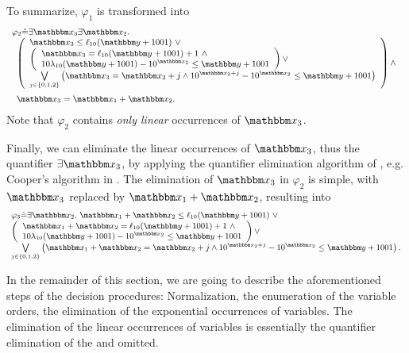 To summarize, $\varphi_1$ is transformed into 
\[
\small
\begin{array}{l}
\varphi_2 \Def \exists \ivarx_3 \exists \ivarx_2. \\
\begin{array}{l}
\vspace{2mm}
\left(
\begin{array}{l}
\ivarx_3 \le \ell_{10}(\ivary+1001)\ \vee \\
\left(
\begin{array}{l}
\ivarx_3 = \ell_{10}(\ivary+1001)+1\ \wedge \\
10 \lambda_{10}(\ivary+1001) - 10^{\ivarx_2} \le \ivary + 1001 
\end{array}
\right) \vee \\
%
 \bigvee \limits_{j \in \{0,1,2\}}  \left(\ivarx_3 = \ivarx_2 +j \wedge 10^{\ivarx_2 + j} - 10^{\ivarx_2} \le \ivary + 1001\right)
\end{array}
\right) 
\wedge \\
 \ivarx_3 = \ivarx_1 + \ivarx_2.
 \end{array}
\end{array}
\]
Note that $\varphi_2$ contains \emph{only linear} occurrences of $\ivarx_3$.

Finally, we can eliminate the linear occurrences of $\ivarx_3$, thus the quantifier $\exists \ivarx_3$, by applying the quantifier elimination algorithm of {\pa}, e.g. Cooper's algorithm in \cite{Cooper72}. The elimination of $\ivarx_3$ in $\varphi_2$ is simple, with $\ivarx_3$ replaced by $\ivarx_1 + \ivarx_2$, resulting into  
\[
\small
\begin{array}{l}
\varphi_3 \Def \exists \ivarx_2.\ 
\ivarx_1 + \ivarx_2 \le \ell_{10}(\ivary+1001)\ \vee \\
\left(
\begin{array}{l}
\ivarx_1 + \ivarx_2 = \ell_{10}(\ivary+1001)+1\ \wedge \\
10 \lambda_{10}(\ivary+1001) - 10^{\ivarx_2} \le \ivary + 1001 
\end{array}
\right) \vee \\
%
 \bigvee \limits_{j \in \{0,1,2\}}  \left(\ivarx_1 + \ivarx_2 = \ivarx_2 +j \wedge 10^{\ivarx_2 + j} - 10^{\ivarx_2} \le \ivary + 1001\right).
\end{array}
\]

\smallskip

In the remainder of this section, we are going to describe the aforementioned steps of the decision procedures: Normalization, the enumeration of the variable orders, 
the elimination of the exponential occurrences of variables. The elimination of the  linear occurrences of variables is essentially the quantifier elimination of the {\pa} and omitted.

